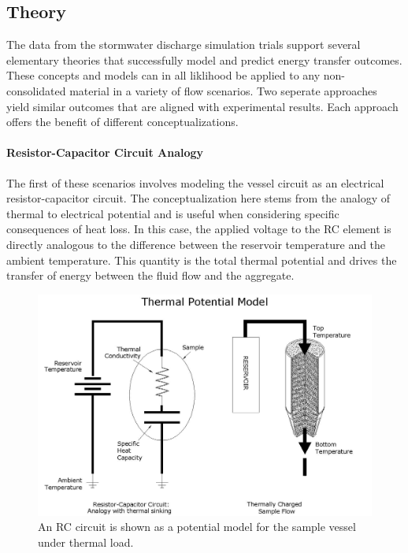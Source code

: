 

\begin{center}
\section{Theory}
\end{center}

The data from the stormwater discharge simulation trials support several elementary theories that successfully model and predict energy transfer outcomes. These concepts and models can in all liklihood be applied to any non-consolidated material  in a variety of flow scenarios. Two seperate approaches yield similar outcomes that are aligned with experimental results. Each approach offers the benefit of different conceptualizations. \\


\paragraph{Resistor-Capacitor Circuit Analogy}
The first of these scenarios involves modeling the vessel circuit as an electrical resistor-capacitor circuit. The conceptualization here stems from the analogy of thermal to electrical potential and is useful when considering specific consequences of heat loss. In this case, the applied voltage to the RC element is directly analogous to the difference between the reservoir temperature and the ambient temperature. This quantity is the total thermal potential and drives the transfer of energy between the fluid flow and the aggregate. 

\begin{figure}
\label{rctherm}
\begin{center}
\includegraphics[scale=.25]{RCtherm.jpg}
\caption{An RC circuit is shown as a potential model for the sample vessel under thermal load.}
\end{center}
\end{figure}

